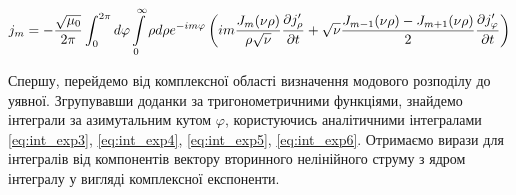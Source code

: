 \begin{equation*} \begin{aligned}
j_m = - \frac{\sqrt{\mu_0}}{2\pi} 
\int_{0}^{2\pi} d \varphi \int \limits_{0}^{\infty} \rho d \rho
e^{-im\varphi} \left( i  m \frac{J_m (\nu \rho)}{\rho \sqrt{\nu}}
\frac{\partial j_\rho^\prime}{\partial t} + \sqrt{\nu}
\frac{J_{m-1} (\nu \rho) - J_{m+1} (\nu \rho)}{2}
\frac{\partial j_\varphi^\prime}{\partial t} \right)
\end{aligned} \end{equation*}

Спершу, перейдемо від комплексної області визначення модового розподілу 
до уявної. Згрупувавши доданки за тригонометричними функціями,
знайдемо інтеграли за азимутальним кутом $ \varphi $, користуючись 
аналітичними інтегралами \eqref{eq:int_exp3}, \eqref{eq:int_exp4}, 
\eqref{eq:int_exp5}, \eqref{eq:int_exp6}. Отримаємо вирази для інтегралів
від компонентів вектору вторинного нелінійного струму з ядром інтегралу у 
вигляді комплексної експоненти.

